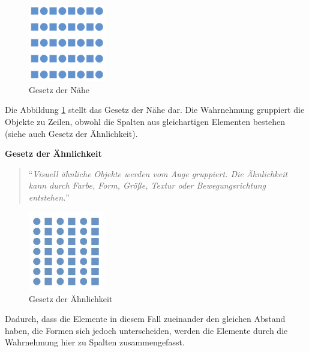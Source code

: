 \begin{figure}[H]
 \centering
 \includegraphics[width=0.2999\textwidth]{grafiken/Gesetz_Naehe.png}
 \caption{Gesetz der Nähe \cite{Schossmann}}
 \label{fig:gesetz1}
\end{figure} 

Die Abbildung \ref{fig:gesetz1} stellt das Gesetz der Nähe dar. Die Wahrnehmung gruppiert die Objekte zu Zeilen, obwohl die Spalten aus gleichartigen Elementen bestehen (siehe auch Gesetz der Ähnlichkeit).

\textbf{Gesetz der Ähnlichkeit}

\begin{quote}
\enquote{\textit{Visuell ähnliche Objekte werden vom Auge gruppiert. Die Ähnlichkeit kann durch Farbe, Form, Größe, Textur oder Bewegungsrichtung entstehen.}}
\end{quote} \cite[S. 185]{Moser2012}

\begin{figure}[H]
 \centering
 \includegraphics[width=0.2999\textwidth]{grafiken/Gesetz_Aehnl.jpg}
 \caption{Gesetz der Ähnlichkeit \cite{Grigo}}
 \label{fig:gesetz2}
\end{figure} 

Dadurch, dass die Elemente in diesem Fall zueinander den gleichen Abstand haben, die Formen sich jedoch unterscheiden, werden die Elemente durch die Wahrnehmung hier zu Spalten zusammengefasst.
